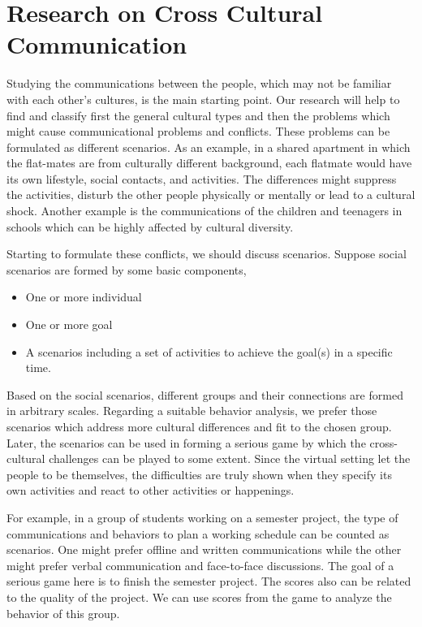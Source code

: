 \documentclass[conference]{IEEEtran}
\begin{document}
\section{Research on Cross Cultural Communication}
Studying the communications between the people,
which may not be familiar with each other's cultures, is the main
starting point. 
Our research will help to find and classify first the general cultural types 
and then the problems which might cause 
communicational problems and conflicts. 
These problems can be formulated as different scenarios.
As an example, in a shared apartment in which the flat-mates are from culturally different background, each flatmate would have its own lifestyle, social contacts, and activities. The differences might suppress the activities, disturb the other people physically or mentally or lead to a cultural shock. Another example is the communications of the children and teenagers in schools which can be highly affected by cultural diversity. 

Starting to formulate these conflicts, we should discuss scenarios.
Suppose social scenarios are formed by some basic components,
\begin{itemize}
\item One or more individual
\item One or more goal
\item A scenarios including a set of activities to achieve the goal(s) 
in a specific time.
\end{itemize}
Based on the social scenarios, different groups and their connections are formed in arbitrary scales. 
Regarding a suitable behavior analysis, we prefer those scenarios which address more cultural differences and fit to the chosen group. Later, the scenarios can be used in forming a serious game by which the cross-cultural challenges can be played to some extent. Since the virtual setting let the people to be themselves, the difficulties are truly shown when they specify its own activities and react to other activities or happenings.

For example, in a group of students working on a semester project, the type of communications and behaviors to plan a working schedule can be counted as scenarios. One might prefer offline and written communications while the other might prefer verbal communication and face-to-face discussions. The goal of a serious game here is to finish the semester project. The scores also can be related to the quality of the project. We can use scores from the game to analyze the behavior of this group. 
\end{document}

